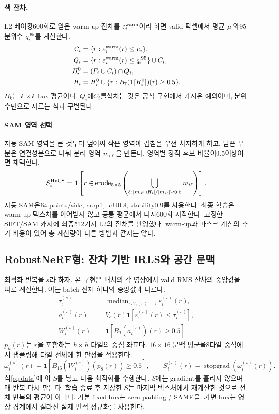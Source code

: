 \documentclass[11pt,a4paper]{article}
\newcommand{\ind}{\mathbf{1}}
\newcommand{\sg}{\operatorname{stopgrad}}
\newcommand{\med}{\operatorname{median}}
\newcommand{\erode}{\operatorname{erode}}
\begin{document}
\paragraph{색 잔차.}
L2 베이킹600회로 얻은 warm-up 잔차를 $\varepsilon_i^{\rm warm}$이라 하면 valid 픽셀에서 평균 $\mu_i$와95분위수 $q_i^{.95}$를 계산한다.
\begin{align}
 C_i&=\{r:\varepsilon_i^{\rm warm}(r)\le\mu_i\},\\
 Q_i&=\{r:\varepsilon_i^{\rm warm}(r)\le q_i^{.95}\}\cup C_i,\\
 H_i^0&=(F_i\cup C_i)\cap Q_i,\\
 H_i&=H_i^0\cup\{r:B_7(\ind[H_i^0])(r)\ge0.5\}.
\end{align}
$B_k$는 $k\times k$ box 평균이다. $Q_i$에$C_i$를합치는 것은 공식 구현에서 가져온 예외이며, 분위수만으로 자르는 식과 구별된다.

\paragraph{SAM 영역 선택.}
자동 SAM 영역을 큰 것부터 덮어써 작은 영역이 겹침을 우선 차지하게 하고, 남은 부분은 연결성분으로 나눠 분리 영역 $m_{i\ell}$을 만든다. 영역별 정적 후보 비율이0.5이상이면 채택한다.
\begin{equation}
 S_i^{\rm HuGS}=
 \ind\left[r\in\erode_{5\times5}\left(
 \bigcup_{\ell:\,|m_{i\ell}\cap H_i|/|m_{i\ell}|\ge0.5}m_{i\ell}
 \right)\right].
\end{equation}
자동 SAM은64 points/side, crop1, IoU0.8, stability0.9를 사용한다. 최종 학습은 warm-up 텍스처를 이어받지 않고 공통 평균에서 다시600회 시작한다. 고정한 SIFT/SAM 캐시에 최종512기저 L2의 잔차를 반영했다. warm-up과 마스크 계산의 추가 비용이 있어 총 계산량이 다른 방법과 같지는 않다.

\subsection{RobustNeRF형: 잔차 기반 IRLS와 공간 문맥}
최적화 반복을 $s$라 하자. 본 구현은 배치의 각 영상에서 valid RMS 잔차의 중앙값을 따로 계산한다. 이는 batch 전체 하나의 중앙값과 다르다.
\begin{align}
 \tau_i^{(s)}&=\med_{r:V_c(r)=1}\varepsilon_i^{(s)}(r),\\
 a_i^{(s)}(r)&=V_c(r)\ind[\varepsilon_i^{(s)}(r)\le\tau_i^{(s)}],\\
 W_i^{(s)}(r)&=\ind[B_3(a_i^{(s)})(r)\ge0.5].
\end{align}
$p_h(r)$는 $r$을 포함하는 $h\times h$ 타일의 중심 좌표다. $16\times16$ 문맥 평균을8타일 중심에서 샘플링해 타일 전체에 한 판정을 적용한다.
\begin{equation}
 \omega_i^{(s)}(r)=\ind[B_{16}(W_i^{(s)})(p_8(r))\ge0.6],\qquad
 S_i^{(s)}(r)=\sg(\omega_i^{(s)}(r)).\label{eq:robust}
\end{equation}
식\eqref{eq:data}에 이 $S$를 넣고 다음 최적화를 수행한다. $S$에는 gradient를 흘리지 않으며 매 반복 다시 만든다. 학습 종료 후 저장한 $S$는 마지막 텍스처에서 재계산한 것으로 전체 반복의 평균이 아니다. 기본 fixed box는 zero padding / SAME을, 가변 box는 영상 경계에서 잘라진 실제 면적 정규화를 사용한다.
\end{document}
